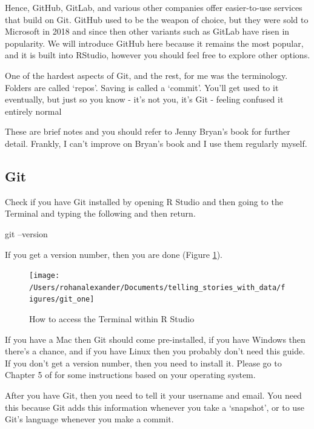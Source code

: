 \documentclass[
]{book}
\newenvironment{Shaded}{\begin{snugshade}}{\end{snugshade}}
\newcommand{\FunctionTok}[1]{\textcolor[rgb]{0.00,0.00,0.00}{#1}}
\newcommand{\NormalTok}[1]{#1}
\begin{document}
Hence, GitHub, GitLab, and various other companies offer easier-to-use services that build on Git. GitHub used to be the weapon of choice, but they were sold to Microsoft in 2018 and since then other variants such as GitLab have risen in popularity. We will introduce GitHub here because it remains the most popular, and it is built into RStudio, however you should feel free to explore other options.

One of the hardest aspects of Git, and the rest, for me was the terminology. Folders are called `repos'. Saving is called a `commit'. You'll get used to it eventually, but just so you know - it's not you, it's Git - feeling confused it entirely normal

These are brief notes and you should refer to Jenny Bryan's book for further detail. Frankly, I can't improve on Bryan's book and I use them regularly myself.

\hypertarget{git}{%
\subsection{Git}\label{git}}

Check if you have Git installed by opening R Studio and then going to the Terminal and typing the following and then return.

\begin{Shaded}
\begin{Highlighting}[]
\FunctionTok{git}\NormalTok{ --version}
\end{Highlighting}
\end{Shaded}

If you get a version number, then you are done (Figure \ref{fig:gitone}).

\begin{figure}
\texttt{[image: /Users/rohanalexander/Documents/telling\_stories\_with\_data/figures/git\_one]} \caption{How to access the Terminal within R Studio}\label{fig:gitone}
\end{figure}

If you have a Mac then Git should come pre-installed, if you have Windows then there's a chance, and if you have Linux then you probably don't need this guide. If you don't get a version number, then you need to install it. Please go to Chapter 5 of \citet{happygit} for some instructions based on your operating system.

After you have Git, then you need to tell it your username and email. You need this because Git adds this information whenever you take a `snapshot', or to use Git's language whenever you make a commit.
\end{document}
